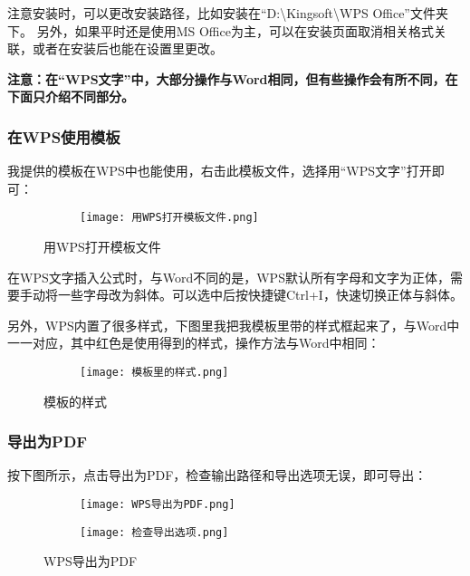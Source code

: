 注意安装时，可以更改安装路径，比如安装在“D:\backslash{}Kingsoft\backslash{}WPS Office”文件夹下。
另外，如果平时还是使用MS Office为主，可以在安装页面取消相关格式关联，或者在安装后也能在设置里更改。

\textbf{注意：在“WPS文字”中，大部分操作与Word相同，但有些操作会有所不同，在下面只介绍不同部分。}

\subsubsection{在WPS使用模板}
我提供的模板在WPS中也能使用，右击此模板文件，选择用“WPS文字”打开即可：
\begin{figure}[!h]
    \centering
    \begin{subfigure}[c]{0.9\textwidth}
    \texttt{[image: 用WPS打开模板文件.png]}
    \end{subfigure}    
    \caption{用WPS打开模板文件}
    \label{WPS 1}
\end{figure}

在WPS文字插入公式时，与Word不同的是，WPS默认所有字母和文字为正体，需要手动将一些字母改为斜体。可以选中后按快捷键Ctrl+I，快速切换正体与斜体。

另外，WPS内置了很多样式，下图里我把我模板里带的样式框起来了，与Word中一一对应，其中红色是使用得到的样式，操作方法与Word中相同：

\begin{figure}[!h]
    \centering
    \begin{subfigure}[c]{0.9\textwidth}
    \texttt{[image: 模板里的样式.png]}
    \end{subfigure}    
    \caption{模板的样式}
    \label{WPS 2}
\end{figure}

\subsubsection{导出为PDF}

按下图所示，点击导出为PDF，检查输出路径和导出选项无误，即可导出：
\begin{figure}[h]
    \centering
    \begin{subfigure}[c]{0.6\textwidth}
      \texttt{[image: WPS导出为PDF.png]}
    \end{subfigure}
    \hfill
    \begin{subfigure}[c]{0.35\textwidth}
      \texttt{[image: 检查导出选项.png]}
    \end{subfigure}
    \caption{WPS导出为PDF}
    \label{WPS 3}
\end{figure}

